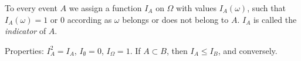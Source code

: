 To every event $A$ we assign a function $I_A$ on $\Omega$ with values $I_A(\omega)$, such that $I_A(\omega) = 1$ or $0$ according as $\omega$ belongs or does not belong to $A$. $I_A$ is called the \textit{indicator} of $A$.

Properties: $I_A^2 = I_A$, $I_\emptyset = 0$, $I_\Omega = 1$. If $A \subset B$, then $I_A \leq I_B$, and conversely.
